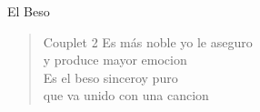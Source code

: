 \begin{song}{El Beso}

\begin{verse}{Couplet 2}
Es más noble yo le aseguro\\
y produce mayor emocion\\
Es el beso sinceroy puro\\
que va unido con una cancion\\
\end{verse}

\end{song}
